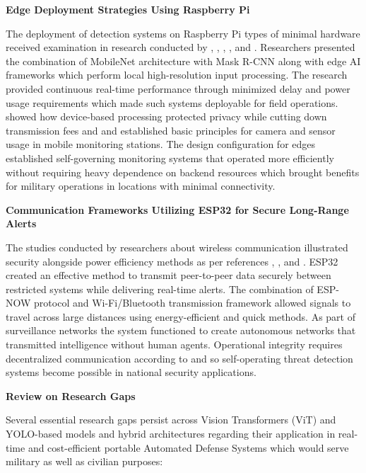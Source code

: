 \documentclass[fleqn,10pt,lineno]{wlpeerj}
\begin{document}
\noindent
\textbf{Edge Deployment Strategies Using Raspberry Pi}

\noindent
The deployment of detection systems on Raspberry Pi types of minimal hardware received examination in research conducted by \cite{3}, \cite{17}, \cite{28}, \cite{2}, and \cite{29}. Researchers presented the combination of MobileNet architecture with Mask R-CNN along with edge AI frameworks which perform local high-resolution input processing. The research provided continuous real-time performance through minimized delay and power usage requirements which made such systems deployable for field operations. \cite{2} showed how device-based processing protected privacy while cutting down transmission fees and \cite{3} and \cite{27} established basic principles for camera and sensor usage in mobile monitoring stations. The design configuration for edges established self-governing monitoring systems that operated more efficiently without requiring heavy dependence on backend resources which brought benefits for military operations in locations with minimal connectivity.
\vspace{1em}

\noindent
\textbf{Communication Frameworks Utilizing ESP32 for Secure Long-Range Alerts}

\noindent
The studies conducted by researchers about wireless communication illustrated security alongside power efficiency methods as per references \cite{30}, \cite{29}, and \cite{36}. ESP32 created an effective method to transmit peer-to-peer data securely between restricted systems while delivering real-time alerts. The combination of ESP-NOW protocol and Wi-Fi/Bluetooth transmission framework allowed signals to travel across large distances using energy-efficient and quick methods. As part of surveillance networks the system functioned to create autonomous networks that transmitted intelligence without human agents. Operational integrity requires decentralized communication according to \cite{29} and \cite{36} so self-operating threat detection systems become possible in national security applications.

\vspace{1em}

\noindent
\textbf{Review on Research Gaps}

\noindent
Several essential research gaps persist across Vision Transformers (ViT) and YOLO-based models and hybrid architectures regarding their application in real-time and cost-efficient portable Automated Defense Systems which would serve military as well as civilian purposes:
\end{document}
